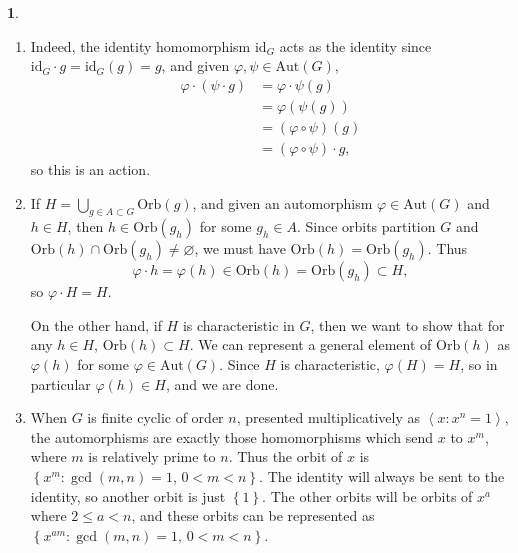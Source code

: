 \documentclass[12pt]{article}
\theoremstyle{definition}
\newtheorem{ex}{}
\newenvironment{exercise}[1]{
	\renewcommand{\theex}{#1}
	\begin{ex}
		}{\end{ex}}
\begin{document}
\begin{exercise}{9}\
	\begin{enumerate}[label=(\alph*)]
		\item Indeed, the identity homomorphism $\mathrm{id}_G$ acts as the identity since $\mathrm{id}_G \cdot g = \mathrm{id}_G(g) = g$, and given $\varphi, \psi \in \mathrm{Aut}(G)$, \begin{align*}
			      \varphi \cdot (\psi \cdot g) & = \varphi \cdot \psi(g)         \\
			                                   & = \varphi(\psi(g))              \\
			                                   & = (\varphi \circ \psi)(g)       \\
			                                   & = (\varphi \circ \psi) \cdot g,
		      \end{align*}
		      so this is an action.
		\item If $H = \bigcup_{g \in A \subset G} \mathrm{Orb}(g)$, and given an automorphism $\varphi \in \mathrm{Aut}(G)$ and $h \in H$, then $h \in \mathrm{Orb}(g_h)$ for some $g_h \in A$.
		      Since orbits partition $G$ and $\mathrm{Orb}(h) \cap \mathrm{Orb}(g_h) \neq \varnothing$, we must have $\mathrm{Orb}(h) = \mathrm{Orb}(g_h)$.
		      Thus \begin{equation*}
			      \varphi \cdot h = \varphi(h) \in \mathrm{Orb}(h) = \mathrm{Orb}(g_h) \subset H,
		      \end{equation*}
		      so $\varphi \cdot H = H$.

		      On the other hand, if $H$ is characteristic in $G$, then we want to show that for any $h \in H$, $\mathrm{Orb}(h) \subset H$.
		      We can represent a general element of $\mathrm{Orb}(h)$ as $\varphi(h)$ for some $\varphi \in \mathrm{Aut}(G)$.
		      Since $H$ is characteristic, $\varphi(H) = H$, so in particular $\varphi(h) \in H$, and we are done.
		\item When $G$ is finite cyclic of order $n$, presented multiplicatively as $\left\langle x : x^n = 1 \right\rangle$, the automorphisms are exactly those homomorphisms which send $x$ to $x^m$, where $m$ is relatively prime to $n$.
		      Thus the orbit of $x$ is $\left\lbrace x^m : \gcd(m, n) = 1\text{, }0 < m < n \right\rbrace$.
		      The identity will always be sent to the identity, so another orbit is just $\left\lbrace 1 \right\rbrace$.
		      The other orbits will be orbits of $x^a$ where $2 \leq a < n$, and these orbits can be represented as $\left\lbrace x^{am} : \gcd(m, n) = 1\text{, }0 < m < n \right\rbrace$.
	\end{enumerate}
\end{exercise}
\end{document}
